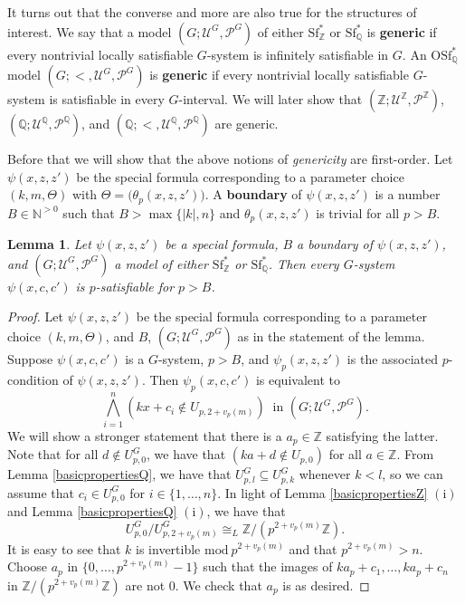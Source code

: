 \documentclass[letterpaper]{amsart}
\newcommand{\qq}{\mathbb{Q}}
\newcommand{\nn}{\mathbb{N}}
\newcommand{\zz}{\mathbb{Z}}
\newcommand{\sU}{\mathscr{U}}
\newcommand{\sP}{\mathscr{P}}
\newcommand{\WSFZ}{\mathrm{Sf}^*_{\zz}}
\newcommand{\WSFQ}{\mathrm{Sf}^*_{\qq}}
\newcommand{\WOSFQ}{\mathrm{OSf}^*_{\qq}}
\newtheorem{lem}[thm]{Lemma}
\begin{document}
\noindent It turns out that the converse and more are also true for the structures of interest. We say that a model $(G; \sU^G, \sP^G)$ of either $\WSFZ$ or  $\WSFQ$ is {\bf generic} if every nontrivial locally satisfiable $G$-system is infinitely satisfiable in $G$. An $\WOSFQ$ model $(G;<, \sU^G, \sP^G)$ is {\bf generic} if every nontrivial locally satisfiable $G$-system is satisfiable in every $G$-interval. We will later show that $( \zz; \sU^\zz, \sP^\zz)$,  $(\qq; \sU^\qq, \sP^\qq)$, and $(\qq; <, \sU^\qq, \sP^\qq)$ are generic.

\medskip\noindent Before that we will show that the above notions of {\it genericity} are first-order. Let $\psi(x, z, z')$ be the special formula corresponding to a parameter choice $(k,m,\Theta)$ with $\Theta = \big( \theta_p(x,z,z')\big)$. A {\bf boundary} of $\psi(x,z,z')$ is a number $B \in  \nn^{>0}$ such that $B>\max\{|k|,n\}$ and $\theta_p(x,z,z')$ is trivial for all $p>B$.
\begin{lem} \label{local condition 1}
Let $\psi (x, z, z')$ be a special formula, $B$ a boundary of $\psi(x,z,z')$, and $(G; \sU^G, \sP^G)$ a model of either $\WSFZ$ or $\WSFQ$. Then every $G$-system $\psi(x, c, c')$ is $p$-satisfiable for $p>B$.
\end{lem}
\begin{proof}
Let $\psi (x, z, z')$ be the special formula corresponding to a parameter choice $(k,m,\Theta)$, and  $B$, $(G; \sU^G, \sP^G)$ as in the statement of the lemma. Suppose $\psi(x, c, c')$ is a $G$-system, $p>B$, and $\psi_p(x,z,z')$ is the associated $p$-condition  of $\psi(x,z,z')$. Then $\psi_p(x, c, c')$ is equivalent to
$$  \bigwedge_{i=1}^n (kx+c_i \notin U_{p, 2+v_p(m)})\  \text{ in  } (G; \sU^G, \sP^G).$$
We will show a stronger statement that there is  a $a_p\in \zz$ satisfying the latter. Note that for all $d\notin U_{p,0}^G$, we have that $(ka+d \notin U_{p, 0})$ for all $a\in \zz$. From Lemma \ref{basicpropertiesQ}, we have that $U_{p,l}^G \subseteq U_{p,k}^G$ whenever $k<l$, so we can assume that $c_i \in U_{p,0}^G$ for $i \in \{1, \ldots, n\}$.  In light of  Lemma \ref{basicpropertiesZ} $\mathrm{(i)}$ and Lemma \ref{basicpropertiesQ} $\mathrm{(i)}$,  we have that 
$$ U^G_{p, 0}\slash U^G_{p, 2+v_p(m)} \cong_{L} \zz \slash (p^{2+v_p(m)}\zz).$$
It is easy to see that $k$ is invertible $\mathrm{mod}\ p^{2+v_p(m)}$ and that $p^{2+v_p(m)}>n$. Choose $a_p$ in $\{0, \ldots, p^{2+v_{p}(m)}-1\}$  such that the images of $ka_p+c_1, \ldots, ka_p+c_n$ in $\zz \slash (p^{2+v_p(m)}\zz)$ are not $0$. We check that $a_p$ is as desired.
\end{proof}
\end{document}
